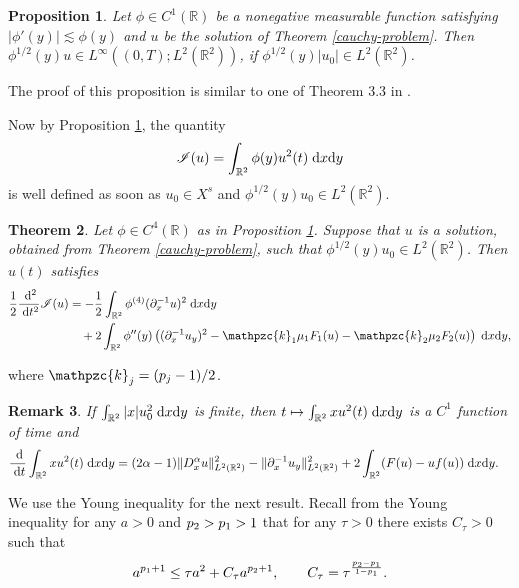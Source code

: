 \documentclass[10pt]{article}
\numberwithin{equation}{section}
\newtheorem{theorem}{\quad Theorem}[section]
\newtheorem{remark}[theorem]{\quad Remark}
\newtheorem{proposition}[theorem]{\quad Proposition}
\newcommand{\nii}{\mathscr{I}}
\newcommand{\ps}{\mathpzc{k}}
\newcommand{\lt}{{L^2(\mathbb{R}^2)}}
\newcommand{\dd}{\;{\rm d}}
\newcommand{\dz}{\;{\rm d}x{\rm d}y}
\newcommand{\nd}{{\partial_x^{-1}}}
\newcommand{\dx}{D_x^{\alpha}}
\newcommand{\al}{\alpha}
\newcommand{\rr}{\mathbb{R}}
\newcommand{\rt}{{\mathbb{R}^2}}
\begin{document}
	
	
	
	\begin{proposition}\label{vir-cd}
		Let $\phi\in C^1(\rr)$ be a nonegative measurable function  satisfying $|\phi'(y)|\lesssim \phi(y) $ and  $u$ be the solution of Theorem \ref{cauchy-problem}. Then	 $\phi^{1/2}(y)u\in L^\infty((0,T); L^2(\rr^2))$, if $\phi^{1/2}(y)|u_0|\in L^2(\rr^2)$. 
	\end{proposition}		 
	
	The proof of this proposition is similar to one of Theorem 3.3 in \cite{saut}.
	
	Now by Proposition \ref{vir-cd}, the quantity 
	\[
	\nii(u)=\int_\rt \phi(y)u^2(t)\dz
	\]
	is well defined as soon as $u_0\in X^s$ and $\phi^{1/2}(y)u_0\in L^2(\rt)$.
	
	\begin{theorem}\label{virial-theorem}
		Let  $\phi\in C^4(\rr)$ as in Proposition \ref{vir-cd}.  Suppose that $u$  is a solution, obtained from Theorem \ref{cauchy-problem}, such that $\phi^{1/2}(y)u_0\in\lt$.
		Then $u(t)$ satisfies
		\begin{equation}\label{virial-id}
			\begin{split}
				\frac{1}{2}	\frac{\dd^2}{\dd t^2}\nii(u)&=-\frac{1}{2}\int_\rt\phi^{(4)} (\nd u)^2\dz\\
				&\quad+  2\int_\rt\phi''(y)\left( (\nd u_y)^2- \ps_1\mu_1F_1(u)-\ps_2\mu_2F_2(u)\right)\dz,
			\end{split}
		\end{equation}
	\end{theorem}
	where
	$\ps_j=(p_j-1)/2$. 
	\begin{remark}%
		If $\int_\rt|x|u_0^2\dz$ is finite, then $t\mapsto\int_\rt xu^2(t)\dz$ is a $C^1$ function of time and
		\begin{equation}
			\begin{split}
				\frac{\dd}{\dd t}\int_\rt xu^2(t)\dz&=
				(2\al-1)\|\dx u\|_\lt^2  -\|\nd u_y\|^2_\lt %
				+2\int_\rt(F(u)-uf(u))\dz.
		\end{split}\end{equation}
	\end{remark}
	
	We use the   Young inequality for the next result. Recall from the Young inequality  for any $a>0$ and ${p_2}>{p_1}>1$ that for any $\tau>0$ there exists $C_\tau>0$ such that
	\begin{equation}\label{young-in}
		a^{{p_1}+1}\leq
		\tau a^2+C_\tau a^{{p_2}+1},\qquad C_\tau=\tau^{\frac{p_2-p_1}{1-p_1}}.
	\end{equation}
	
\end{document}
